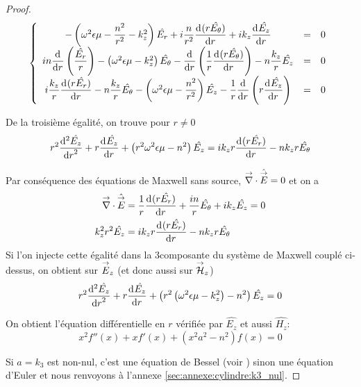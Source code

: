 \begin{proof}
    \begin{equation*}
      \left\lbrace
      \begin{array}{ccc}
        -\left(\w^2\eps\mu -\frac{n^2}{r^2}  - k_z^2\right)\hat{E_r}  +i\frac{n}{r^2}\ddp{r}{(r\hat{E_\theta})}  +i k_z\ddp{r}{\hat{E_z}} & = & 0
        \\
        in\ddp{r}{}\left(\frac{\hat{E_r}}{r}\right) -\left(\w^2\eps\mu - k_z^2\right)\hat{E_\theta} - \ddp{r}{}\left(\frac{1}{r}\ddp{r}{(r\hat{E_\theta})}\right)  - n\frac{k_z}{r}\hat{E_z} & = & 0
        \\
        i\frac{k_z}{r}\ddp{r}{(r\hat{E_r})}  - n\frac{k_z}{r}\hat{E_\theta}  -\left(\w^2\eps\mu - \frac{n^2}{r^2} \right)\hat{E_z} - \frac{1}{r}\ddp{r}{}\left(r\ddp{r}{\hat{E_z}}\right) & = & 0
      \end{array}
      \right.
    \end{equation*}

    De la troisième égalité, on trouve pour \(r\not=0\)
    \begin{equation*}
    r^2 \ddp[2]{r}{\hat{E_z}} + r\ddp{r}{\hat{E_z}} + \left(r^2\w^2\eps\mu - n^2\right)\hat{E_z} =ik_zr\ddp{r}{(r\hat{E_r})} -  nk_zr\hat{E_\theta}
    \end{equation*}

    Par conséquence des équations de Maxwell sans source, \(\vdiv \hat \vE = 0\) et on a
    \begin{align*}
      \vdiv\hat \vE &= \frac{1}{r}\ddp{r}{(r\hat{E_r})} + \frac{in}{r}\hat{E_\theta} + ik_z\hat{E_z} = 0
      \\
      k_z^2r^2 \hat{E_z} &= ik_zr\ddp{r}{(r\hat{E_r})} - nk_zr\hat{E_\theta}
    \end{align*}
    Si l'on injecte cette égalité dans la 3\ieme composante du système de Maxwell couplé ci-dessus, on obtient sur \(\vE_z\) (et donc aussi sur \(\vH_z\))
    \begin{equation*}
      r^2 \ddp[2]{r}{\hat{E_z}} + r\ddp{r}{\hat{E_z}} + \left(r^2\left(\w^2\eps\mu - k_z^2\right) - n^2\right)\hat{E_z} = 0
    \end{equation*}

    On obtient l'équation différentielle en \(r\) vérifiée par \(\hat{E_z}\) et aussi \(\hat{H_z}\):
    \begin{equation*}
      x^2 f''(x) + xf'(x) + \left(x^2a^2 - n^2\right)f(x) = 0
    \end{equation*}

    Si \(a = k_3\) est non-nul, c'est une équation de Bessel (voir \cite[eq (6.80)]{bowman_introduction_1958}) sinon une équation d'Euler et nous renvoyons à l'annexe \ref{sec:annexe:cylindre:k3_nul}.


\end{proof}
